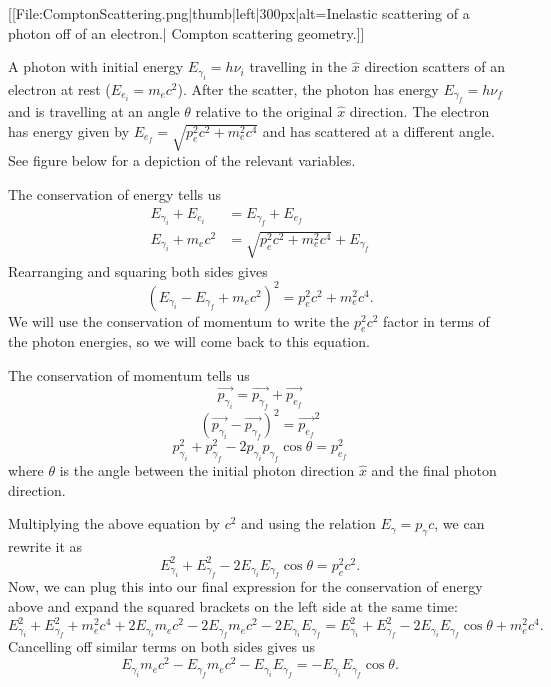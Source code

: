\documentclass{article}
\begin{document}
[[File:ComptonScattering.png|thumb|left|300px|alt=Inelastic scattering of a photon off of an electron.| Compton scattering geometry.]]

A photon with initial energy $E_{\gamma_i}  = h \nu_i$ travelling in the $\hat{x}$ direction scatters of an electron at rest ($E_{e_{i}} = m_ec^2$). After the scatter, the photon has energy $E_{\gamma_f} = h \nu_f$ and is travelling at an angle $\theta$ relative to the original $\hat{x}$ direction. The electron has energy given by $E_{e_f} = \sqrt{ p_e^2 c^2 + m_e^2 c^4}$ and has scattered at a different angle. See figure below for a depiction of the relevant variables.

The conservation of energy tells us
$$\begin{aligned} 
E_{\gamma_i} + E_{e_i} &= E_{\gamma_f} + E_{e_f} \\
E_{\gamma_i} + m_ec^2 &= \sqrt{p_e^2 c^2 + m_e^2 c^4} + E_{\gamma_f} 
\end{aligned}$$
Rearranging and squaring both sides gives
\begin{equation}
(E_{\gamma_i} - E_{\gamma_f} + m_ec^2)^2 = p_e^2 c^2 + m_e^2 c^4.
\label{eq:inter}
\end{equation}
We will use the conservation of momentum to write the $p_e^2 c^2$ factor in terms of the photon energies, so we will come back to this equation.

The conservation of momentum tells us
$$\vec{p_{\gamma_i}} = \vec{p_{\gamma_f}} + \vec{p_{e_f}} $$
$$(\vec{p_{\gamma_i}} - \vec{p_{\gamma_f}} )^2 = \vec{p_{e_f}}^2 $$
\begin{equation}
p_{\gamma_i}^2 + p_{\gamma_f}^2 - 2 p_{\gamma_i} p_{\gamma_f} \cos \theta = p_{e_f}^2
\label{eq:2}
\end{equation}
where $\theta$ is the angle between the initial photon direction $\hat{x}$ and the final photon direction.

Multiplying the above equation by $c^2$ and using the relation $E_\gamma = p_\gamma c$, we can rewrite it as
$$E_{\gamma_i}^2 + E_{\gamma_f}^2 - 2 E_{\gamma_i}E_{\gamma_f}\cos\theta = p_e^2 c^2.$$
Now, we can plug this into our final expression for the conservation of energy above and expand the squared brackets on the left side at the same time:
$${E_{\gamma_i}^2} + {E_{\gamma_f}^2} + {m_e^2c^4} + {2} E_{\gamma_i}m_ec^2 - {2}E_{\gamma_f} m_ec^2 - {2}E_{\gamma_i}E_{\gamma_f} = {E_{\gamma_i}^2} + {E_{\gamma_f}^2} - {2}E_{\gamma_i}E_{\gamma_f}\cos\theta + {m_e^2c^4}.$$
Cancelling off similar terms on both sides gives us
$$ E_{\gamma_i} m_e c^2 - E_{\gamma_f} m_e c^2 - E_{\gamma_i}E_{\gamma_f} = -E_{\gamma_i}E_{\gamma_f} \cos \theta.$$
\end{document}
